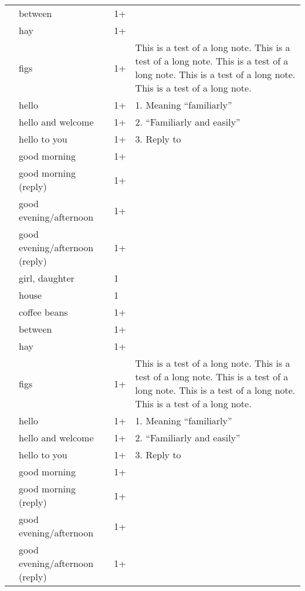 \documentclass[10pt]{article}
\begin{document}
\begin{center}
\begin{supertabular*}{\textwidth}{p{0.2\textwidth}p{0.3\textwidth}p{1.5em}|p{0.38\textwidth}}
 & between & 1+ \\
 & hay & 1+ \\
 & figs & 1+ & This is a test of a long note. This is a test of a long note. This is a test of a long note. This is a test of a long note. This is a test of a long note. \\
 & hello & 1+  &  1. Meaning ``familiarly'' \\
 & hello and welcome & 1+ & 2. ``Familiarly and easily'' \\
 & hello to you & 1+ & 3. Reply to  \\
 & good morning & 1+ \\
 & good morning (reply) & 1+ \\
 & good evening/afternoon & 1+ \\
 & good evening/afternoon (reply) & 1+ \\
 & girl, daughter & 1 \\
 & house & 1 \\
 & coffee beans & 1+ \\
 & between & 1+ \\
 & hay & 1+ \\
 & figs & 1+ & This is a test of a long note. This is a test of a long note. This is a test of a long note. This is a test of a long note. This is a test of a long note. \\
 & hello & 1+  &  1. Meaning ``familiarly'' \\
 & hello and welcome & 1+ & 2. ``Familiarly and easily'' \\
 & hello to you & 1+ & 3. Reply to  \\
 & good morning & 1+ \\
 & good morning (reply) & 1+ \\
 & good evening/afternoon & 1+ \\
 & good evening/afternoon (reply) & 1+ \\
\end{supertabular*}
\end{center}
\end{document}

